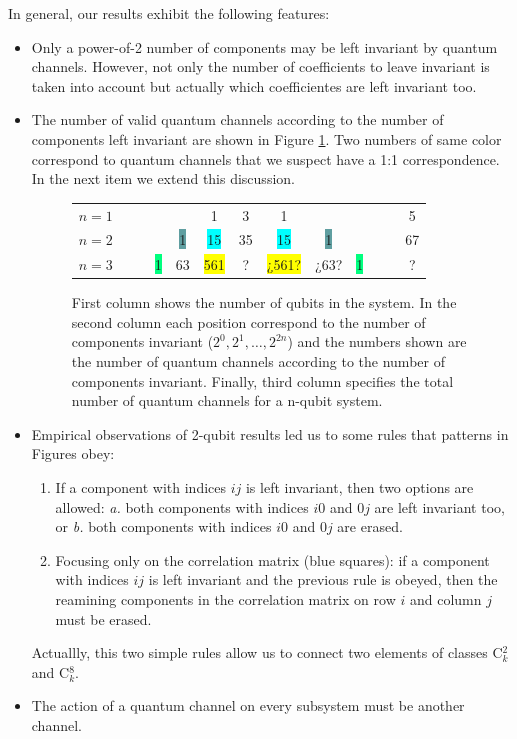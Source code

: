 \documentclass[11pt,dvipsnames]{article}
\begin{document}
In general, our results exhibit the following features:
\begin{itemize}
\item Only a power-of-2 number of components may be left invariant by 
			quantum channels. However,
			not only the number of 
			coefficients to leave invariant is taken into account but actually
			which coefficientes are left invariant too.

\item 
The number of valid quantum channels according to the number of components
left invariant are shown in Figure \ref{fig:CCs-by-components}. Two numbers
of same color correspond to quantum channels that we suspect have a 1:1 
correspondence. In the next item we extend this discussion.

\begin{figure}[H]
	\centering
		\begin{tabular}{>{$n=}l<{$\hfill}*{12}{c}}
			1 &&&&&\colorbox{Apricot}{1}&3&\colorbox{Apricot}{1}&&&&&5\\
			2 &&&&\colorbox{CadetBlue}{1}&\colorbox{Cyan}{15}&35&\colorbox{Cyan}{15}&\colorbox{CadetBlue}{1}&&&&67\\
			3 &&&\colorbox{SpringGreen}{1}&\colorbox{RedOrange}{63}&\colorbox{Yellow}{561}&?&\colorbox{Yellow}{¿561?}&
				\colorbox{RedOrange}{¿63?}&\colorbox{SpringGreen}{1}&&&?
			\end{tabular}
			\caption{First column shows the number of qubits in the system. 
							In the second column each position correspond to the 
							number of components invariant ($2^0, 2^1, \ldots, 2^{2n}$) and
							the numbers shown are the number of quantum channels according to 
							the number of components invariant.
							Finally, third column specifies the total number of quantum 
							channels for a n-qubit system.}
			\label{fig:CCs-by-components}
\end{figure}

\item Empirical observations of 2-qubit results led us to some rules that 
			patterns in Figures obey:
			\begin{enumerate}
				\item If a component with indices $ij$ is left invariant, then two 
							options are allowed: \textit{a.} both components with indices $i0$ 
							and $0j$ are left invariant too, or \textit{b.} both
							components with indices $i0$ and $0j$ are erased.
				\item Focusing only on the correlation matrix (blue squares): if a 
							component	with indices $ij$ is left invariant and the previous 
							rule is obeyed, then the reamining components in the correlation 
							matrix on row $i$ and column $j$ must be erased.
			\end{enumerate}	Actuallly, this two simple rules allow us to connect
			two elements of classes C${}^2_k$ and C${}^8_k$.

	\item The action of a quantum channel on every subsystem must be another
				channel.

\end{itemize}
\end{document}
